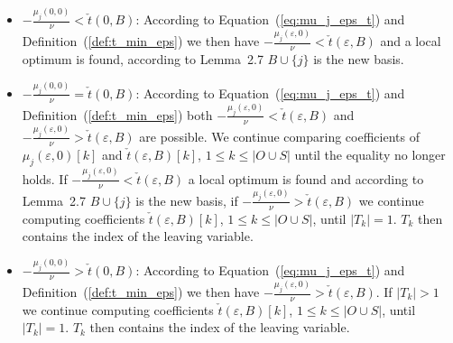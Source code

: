 \documentclass[a4paper]{article}
\begin{document}
\begin{itemize}
\item $-\frac{\mu_{j}(0, 0)}{\nu} < \check{t}(0, B)$:
According to Equation~(\ref{eq:mu_j_eps_t}) and
Definition~(\ref{def:t_min_eps}) we then have
$-\frac{\mu_{j}(\varepsilon, 0)}{\nu} < \check{t}(\varepsilon, B)$ and a local
optimum is found, according to Lemma~2.7 $B \cup \{j\}$ is the new basis.

\item $-\frac{\mu_{j}(0, 0)}{\nu} = \check{t}(0, B)$:
According to Equation~(\ref{eq:mu_j_eps_t}) and
Definition~(\ref{def:t_min_eps})
both $-\frac{\mu_{j}(\varepsilon, 0)}{\nu} < \check{t}(\varepsilon, B)$ and
$-\frac{\mu_{j}(\varepsilon, 0)}{\nu} > \check{t}(\varepsilon, B)$ are
possible.
We continue comparing coefficients of $\mu_{j}(\varepsilon, 0)[k]$ and
$\check{t}(\varepsilon, B)[k]$, $1 \leq k \leq \left|O \cup S \right|$
until the equality no longer holds.  
If $-\frac{\mu_{j}(\varepsilon, 0)}{\nu} < \check{t}(\varepsilon, B)$
a local optimum is found and according to Lemma~2.7 $B \cup \{j\}$ is the new
basis,
if $-\frac{\mu_{j}(\varepsilon, 0)}{\nu} > \check{t}(\varepsilon, B)$
we continue computing coefficients
$\check{t}(\varepsilon, B)[k]$, $1 \leq k \leq \left|O \cup S \right|$, until
$\left|T_{k}\right|=1$. $T_{k}$ then contains the index of the leaving
variable.
 
\item $-\frac{\mu_{j}(0, 0)}{\nu} > \check{t}(0, B)$:
According to Equation~(\ref{eq:mu_j_eps_t}) and
Definition~(\ref{def:t_min_eps}) we then have
$-\frac{\mu_{j}(\varepsilon, 0)}{\nu} > \check{t}(\varepsilon, B)$. If
$\left|T_{k}\right| > 1$ we continue computing coefficients
$\check{t}(\varepsilon, B)[k]$, $1 \leq k \leq \left|O \cup S \right|$, until
$\left|T_{k}\right|=1$. $T_{k}$ then contains the index of the leaving
variable.
\end{itemize}
\end{document}
